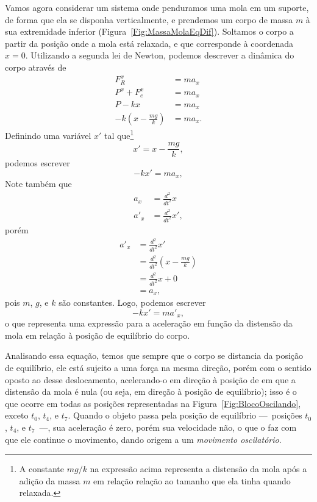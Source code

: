 Vamos agora considerar um sistema onde penduramos uma mola em um suporte, de forma que ela se disponha verticalmente, e prendemos um corpo de massa $m$ à sua extremidade inferior (Figura~\ref{Fig:MassaMolaEqDif}). Soltamos o corpo a partir da posição onde a mola está relaxada, e que corresponde à coordenada $x = 0$. Utilizando a segunda lei de Newton, podemos descrever a dinâmica do corpo através de
\begin{align}
    F_R^x &= m a_x \\
	P^x + F_e^x &= ma_x \\
	P - kx &= m a_x \\
	-k \left(x - \frac{mg}{k}\right) &= ma_x.
\end{align}
%
Definindo uma variável $x'$ tal que\footnote{A constante $mg/k$ na expressão acima representa a distensão da mola após a adição da massa $m$ em relação relação ao tamanho que ela tinha quando relaxada.}
\begin{equation}\label{eq:MassaMolaDefXPrime}
	x' = x - \frac{mg}{k},
\end{equation}
%
podemos escrever
\begin{equation}
	-kx' = ma_x,
\end{equation}
%
Note também que
\begin{align}
    a_x &= \frac{d^2}{dt^2}x \\
    a'_x &= \frac{d^2}{dt^2}x',
\end{align}
%
porém
\begin{align}
    a'_x &= \frac{d^2}{dt^2} x' \\
    &= \frac{d^2}{dt^2} \left(x - \frac{mg}{k}\right) \\
    &= \frac{d^2}{dt^2}x + 0\\
    &= a_x,
\end{align}
%
pois $m$, $g$, e $k$ são constantes. Logo, podemos escrever
\begin{equation}
    -kx' = m a'_x,
\end{equation}
%
o que representa uma expressão para a aceleração em função da distensão da mola em relação à posição de equilíbrio do corpo.

Analisando essa equação, temos que sempre que o corpo se distancia da posição de equilíbrio, ele está sujeito a uma força na mesma direção, porém com o sentido oposto ao desse deslocamento, acelerando-o em direção à posição de em que a distensão da mola é nula (ou seja, em direção à posição de equilíbrio); isso é o que ocorre em todas as posições representadas na Figura~\ref{Fig:BlocoOscilando}, exceto $t_0$, $t_4$, e $t_7$. Quando o objeto passa pela posição de equilíbrio ---~posições $t_0$, $t_4$, e $t_7$~---, sua aceleração é zero, porém sua velocidade não, o que o faz com que ele continue o movimento, dando origem a um \emph{movimento oscilatório}.

